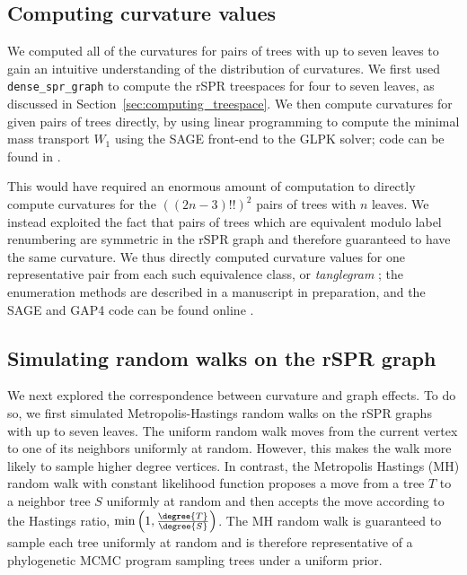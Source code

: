 \documentclass[11pt,onecolumn,conference]{IEEEtran}
\begin{document}
\subsection{Computing curvature values}
We computed all of the curvatures for pairs of trees with up to seven leaves to gain an intuitive understanding of the distribution of curvatures.
We first used \texttt{dense\_spr\_graph} to compute the rSPR treespaces for four to seven leaves, as discussed in Section~\ref{sec:computing_treespace}.
We then compute curvatures for given pairs of trees directly, by using linear programming to compute the minimal mass transport $W_1$ using the SAGE \cite{SAGE} front-end to the GLPK  solver; code can be found in \cite{gricci}.

This would have required an enormous amount of computation to directly compute curvatures for the $((2n-3)!!)^2$ pairs of trees with $n$ leaves.
We instead exploited the fact that pairs of trees which are equivalent modulo label renumbering are symmetric in the rSPR graph and therefore guaranteed to have the same curvature.
We thus directly computed curvature values for one representative pair from each such equivalence class, or \emph{tanglegram} \cite{Venkatachalam2010-zh}; the enumeration methods are described in a manuscript in preparation, and the SAGE \cite{SAGE} and GAP4 \cite{GAP4} code can be found online \cite{tangle}.


\subsection{Simulating random walks on the rSPR graph}
\label{sec:random_walks}
We next explored the correspondence between curvature and graph effects.
To do so, we first simulated Metropolis-Hastings random walks on the rSPR graphs with up to seven leaves.
The uniform random walk moves from the current vertex to one of its neighbors uniformly at random.
However, this makes the walk more likely to sample higher degree vertices.
In contrast, the Metropolis Hastings (MH) random walk with constant likelihood function proposes a move from a tree $T$ to a neighbor tree $S$ uniformly at random and then accepts the move according to the Hastings ratio, $\min\left(1, \frac{\degree{T}}{\degree{S}}\right)$.
The MH random walk is guaranteed to sample each tree uniformly at random and is therefore representative of a phylogenetic MCMC program sampling trees under a uniform prior.
\end{document}
